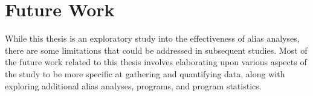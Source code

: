 \chapter{Future Work}

While this thesis is an exploratory study into the effectiveness of alias analyses, there are some limitations that could be addressed in subsequent studies. Most of the future work related to this thesis involves elaborating upon various aspects of the study to be more specific at gathering and quantifying data, along with exploring additional alias analyses, programs, and program statistics.

